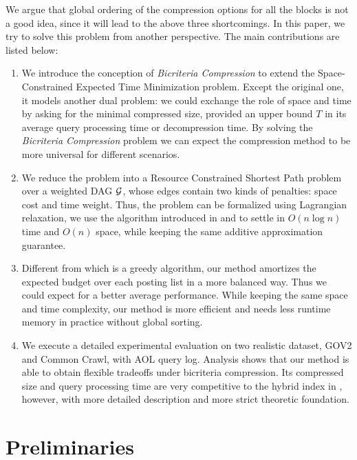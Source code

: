 \documentclass{sig-alternate-05-2015}
\begin{document}
We argue that global ordering of the compression options for all the blocks is not a good idea, since it will lead to the above three shortcomings.
In this paper, we try to solve this problem from another perspective.
The main contributions are listed below:
\begin{enumerate}
	\item We introduce the conception of \textit{Bicriteria Compression} \cite{farruggia2014bicriteria} to extend the Space-Constrained Expected Time Minimization problem.
	Except the original one, it models another dual problem: we could exchange the role of space and time by asking for the minimal compressed size, provided an upper bound $ T $ in its average query processing time or decompression time.
	By solving the \textit{Bicriteria Compression} problem we can expect the compression method to be more universal for different scenarios.
	\item We reduce the problem into a Resource Constrained Shortest Path problem \cite{mehlhorn2000resource} over a weighted DAG $ \cal G $, whose edges contain two kinds of penalties: space cost and time weight.
	Thus, the problem can be formalized using Lagrangian relaxation, we use the algorithm introduced in \cite{farruggia2014bicriteria} and \cite{handler1980dual} to settle in $ O(n\log n) $ time and $ O(n) $ space, while keeping the same additive approximation guarantee.
	\item Different from \cite{ottaviano2015optimal} which is a greedy algorithm, our method amortizes the expected budget over each posting list in a more balanced way.
	Thus we could expect for a better average performance.
	While keeping the same space and time complexity, our method is more efficient and needs less runtime memory in practice without global sorting.
	\item We execute a detailed experimental evaluation on two realistic dataset, GOV2 and Common Crawl, with AOL query log.
	Analysis shows that our method is able to obtain flexible tradeoffs under bicriteria compression.
	Its compressed size and query processing time are very competitive to the hybrid index in \cite{ottaviano2015optimal}, however, with more detailed description and more strict theoretic foundation.
\end{enumerate}

\section{Preliminaries}\label{sec: preliminaries}
\end{document}
